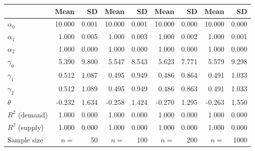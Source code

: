 
\begin{tabular}[t]{lrrrrrrrr}
\toprule
  & Mean & SD & Mean  & SD  & Mean   & SD   & Mean    & SD   \\
\midrule
$\alpha_{0}$ & 10.000 & 0.001 & 10.000 & 0.001 & 10.000 & 0.000 & 10.000 & 0.000\\
$\alpha_{1}$ & 1.000 & 0.005 & 1.000 & 0.003 & 1.000 & 0.002 & 1.000 & 0.001\\
$\alpha_{2}$ & 1.000 & 0.000 & 1.000 & 0.000 & 1.000 & 0.000 & 1.000 & 0.000\\
$\gamma_{0}$ & 5.390 & 9.800 & 5.547 & 8.543 & 5.623 & 7.771 & 5.579 & 9.298\\
$\gamma_{1}$ & 0.512 & 1.087 & 0.495 & 0.949 & 0.486 & 0.864 & 0.491 & 1.033\\
$\gamma_{2}$ & 0.512 & 1.089 & 0.495 & 0.949 & 0.486 & 0.863 & 0.491 & 1.033\\
$\theta$ & -0.232 & 1.634 & -0.258 & 1.424 & -0.270 & 1.295 & -0.263 & 1.550\\
$R^{2}$ (demand) & 1.000 & 0.000 & 1.000 & 0.000 & 1.000 & 0.000 & 1.000 & 0.000\\
$R^{2}$ (supply) & 1.000 & 0.000 & 1.000 & 0.000 & 1.000 & 0.000 & 1.000 & 0.000\\
Sample size & $n =$ & 50 & $n =$ & 100 & $n =$ & 200 & $n =$ & 1000\\
\bottomrule
\end{tabular}
